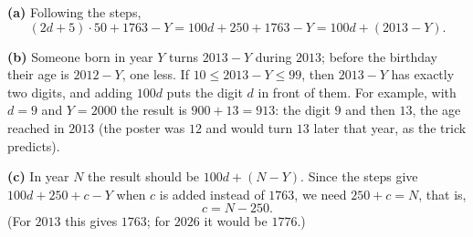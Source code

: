 \textbf{(a)} Following the steps,
\[
(2d+5)\cdot50+1763-Y=100d+250+1763-Y=100d+(2013-Y).
\]

\textbf{(b)} Someone born in year $Y$ turns $2013-Y$ during $2013$; before the birthday their age is $2012-Y$, one less. If $10\le 2013-Y\le99$, then $2013-Y$ has exactly two digits, and adding $100d$ puts the digit $d$ in front of them. For example, with $d=9$ and $Y=2000$ the result is $900+13=913$: the digit $9$ and then $13$, the age reached in $2013$ (the poster was $12$ and would turn $13$ later that year, as the trick predicts).

\textbf{(c)} In year $N$ the result should be $100d+(N-Y)$. Since the steps give $100d+250+c-Y$ when $c$ is added instead of $1763$, we need $250+c=N$, that is,
\[
c=\boxed{N-250}.
\]
(For $2013$ this gives $1763$; for $2026$ it would be $1776$.)
